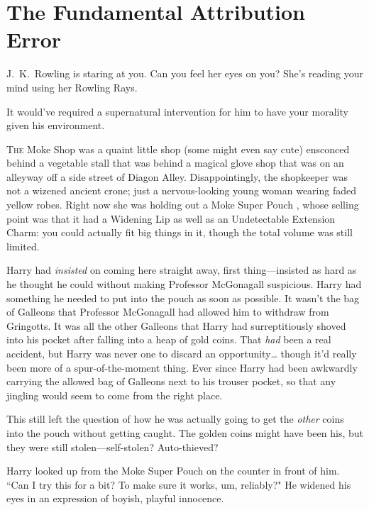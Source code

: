 \chapter{The Fundamental Attribution Error}

\begin{chapterOpeningAuthorNote}
J.~K.~Rowling is staring at you. Can you feel her eyes on you? She's reading your mind using her Rowling Rays.
\end{chapterOpeningAuthorNote}
\begin{chapterOpeningQuote}
It would've required a supernatural intervention for him to have your morality given his environment.
\end{chapterOpeningQuote}

\lettrine{T}{he} Moke Shop was a quaint little shop (some might even say cute) ensconced behind a vegetable stall that was behind a magical glove shop that was on an alleyway off a side street of Diagon Alley. Disappointingly, the shopkeeper was not a wizened ancient crone; just a nervous-looking young woman wearing faded yellow robes. Right now she was holding out a Moke Super Pouch , whose selling point was that it had a Widening Lip as well as an Undetectable Extension Charm: you could actually fit big things in it, though the total volume was still limited.

Harry had \emph{insisted} on coming here straight away, first thing—insisted as hard as he thought he could without making Professor McGonagall suspicious. Harry had something he needed to put into the pouch as soon as possible. It wasn't the bag of Galleons that Professor McGonagall had allowed him to withdraw from Gringotts. It was all the other Galleons that Harry had surreptitiously shoved into his pocket after falling into a heap of gold coins. That \emph{had} been a real accident, but Harry was never one to discard an opportunity{\ldots} though it'd really been more of a spur-of-the-moment thing. Ever since Harry had been awkwardly carrying the allowed bag of Galleons next to his trouser pocket, so that any jingling would seem to come from the right place.

This still left the question of how he was actually going to get the \emph{other} coins into the pouch without getting caught. The golden coins might have been his, but they were still stolen—self-stolen? Auto-thieved?

Harry looked up from the Moke Super Pouch  on the counter in front of him. ``Can I try this for a bit? To make sure it works, um, reliably?" He widened his eyes in an expression of boyish, playful innocence.

